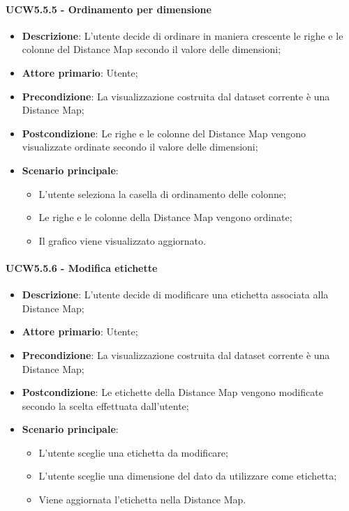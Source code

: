 \paragraph{UCW5.5.5 - Ordinamento per dimensione}
\label{par:ucw5.5.5}
\begin{itemize}
    \item \textbf{Descrizione}: L'utente decide di ordinare in maniera crescente le righe e le colonne del Distance Map secondo il valore delle dimensioni;
    \item \textbf{Attore primario}: Utente;
    \item \textbf{Precondizione}: La visualizzazione costruita dal dataset corrente è una Distance Map;
    \item \textbf{Postcondizione}: Le righe e le colonne del Distance Map vengono visualizzate ordinate secondo il valore delle dimensioni;
    \item \textbf{Scenario principale}:
    \begin{itemize}
        \item L'utente seleziona la casella di ordinamento delle colonne;
        \item Le righe e le colonne della Distance Map vengono ordinate;
        \item Il grafico viene visualizzato aggiornato.
    \end{itemize}
\end{itemize}


\paragraph{UCW5.5.6 - Modifica etichette}
\label{par:ucw5.5.6}
\begin{itemize}
    \item \textbf{Descrizione}: L'utente decide di modificare una etichetta associata alla Distance Map;
    \item \textbf{Attore primario}: Utente;
    \item \textbf{Precondizione}: La visualizzazione costruita dal dataset corrente è una Distance Map;
    \item \textbf{Postcondizione}: Le etichette della Distance Map vengono modificate secondo la scelta effettuata dall'utente;
    \item \textbf{Scenario principale}:
    \begin{itemize}
        \item L'utente sceglie una etichetta da modificare;
        \item L'utente sceglie una dimensione del dato da utilizzare come etichetta;
        \item Viene aggiornata l'etichetta nella Distance Map.
    \end{itemize}
\end{itemize}


